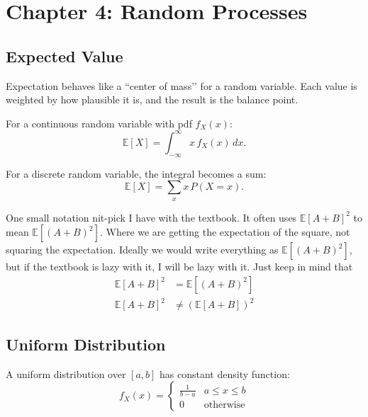 \section{Chapter 4: Random Processes}

\subsection{Expected Value}
\label{subsec:expectedvalue}

\begin{idea}
	Expectation behaves like a ``center of mass’’ for a random variable.
	Each value is weighted by how plausible it is, and the result is the balance point.
\end{idea}

For a continuous random variable with pdf $f_X(x)$:
\begin{equation}\label{eq:expectedvalue}
	\mathbb{E}[X] = \int_{-\infty}^{\infty} x\, f_X(x)\, dx.
\end{equation}

For a discrete random variable, the integral becomes a sum:
\begin{equation}\label{eq:expectedvaluediscrete}
	\mathbb{E}[X] = \sum_x x\,P(X=x).
\end{equation}

One small notation nit-pick I have with the textbook. It often uses
\(\mathbb{E}[A+B]^2\) to mean \(\mathbb{E}[(A+B)^2]\). Where we are
getting the expectation of the square, not squaring the expectation.
Ideally we would write everything as \(\mathbb{E}[(A+B)^2]\), but if
the textbook is lazy with it, I will be lazy with it. Just keep in mind that
\begin{align*}
	\mathbb{E}[A+B]^2 & = \mathbb{E}[(A+B)^2]    \\
	\mathbb{E}[A+B]^2 & \neq (\mathbb{E}[A+B])^2
\end{align*}


\subsection{Uniform Distribution}

A uniform distribution over $[a,b]$ has constant density function:
\begin{equation}\label{eq:uniformpdf}
	f_X(x) =
	\begin{cases}
		\frac{1}{b-a} & a\leq x\leq b    \\
		0             & \text{otherwise}
	\end{cases}
\end{equation}

